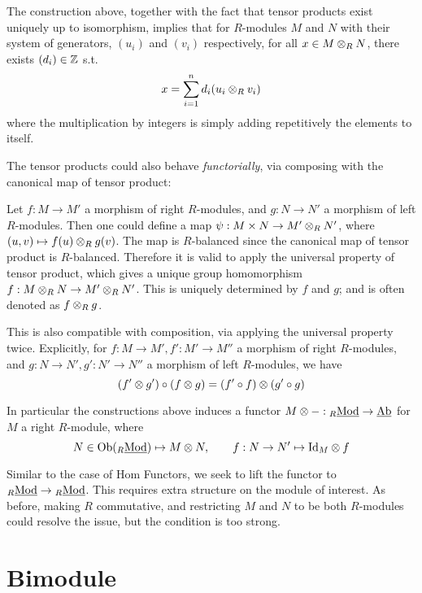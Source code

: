 \begin{remark}\label{Rmk:decomp of tensor}
    The construction above, together with the fact that tensor products exist uniquely up to isomorphism, implies that for $R$-modules $M$ and $N$ with their system of generators, $(u_i)$ and $(v_i)$ respectively, for all $x \in M \otimes_R N$, there exists $(d_i) \in \mathbb{Z}$ s.t.
    \[
        x = \sum\limits_{i=1}^n d_i (u_i \otimes_R v_i)
    \]
    where the multiplication by integers is simply adding repetitively the elements to itself.
\end{remark}

The tensor products could also behave \emph{functorially}, via composing with the canonical map of tensor product:

Let $f: M \to M'$ a morphism of right $R$-modules, and $g: N \to N'$ a morphism of left $R$-modules. Then one could define a map $\psi: M \times N \to M' \otimes_R N'$, where $(u, v) \mapsto f(u) \otimes_R g(v)$. The map is $R$-balanced since the canonical map of tensor product is $R$-balanced. Therefore it is valid to apply the universal property of tensor product, which gives a unique group homomorphism $f: M \otimes_R N \to M' \otimes_R N' $. This is uniquely determined by $f$ and $g$; and is often denoted as $f \otimes_R g$. 

\begin{remark}
    This is also compatible with composition, via applying the universal property twice. Explicitly, for $f: M \to M', f': M' \to M''$ a morphism of right $R$-modules, and $g: N \to N', g': N' \to N''$ a morphism of left $R$-modules, we have
    \[
        (f' \otimes g') \circ (f \otimes g) = (f' \circ f) \otimes (g' \circ g)
    \]
\end{remark}

\begin{remark}
    In particular the constructions above induces a functor $M \otimes -: {}_{R}\underline{\textup{Mod}} \to \underline{\textup{Ab}}$ for $M$ a right $R$-module, where 
    \[
        N \in \mathrm{Ob}({}_{R}\underline{\textup{Mod}}) \mapsto M \otimes N, \qquad f: N \to N' \mapsto \mathrm{Id}_{M} \otimes f
    \]
\end{remark}

Similar to the case of Hom Functors, we seek to lift the functor to ${}_{R}\underline{\textup{Mod}} \to {}_{R}\underline{\textup{Mod}}$. This requires extra structure on the module of interest. As before, making $R$ commutative, and restricting $M$ and $N$ to be both $R$-modules could resolve the issue, but the condition is too strong.  

\section{Bimodule}


